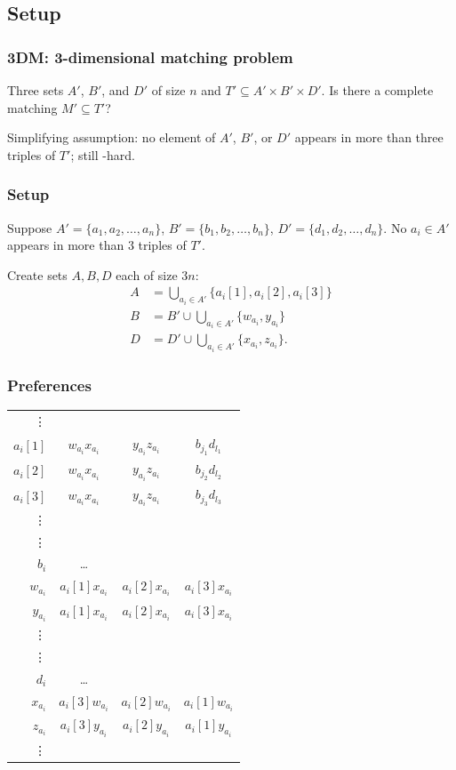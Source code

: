 \documentclass[mathserif,serif]{beamer}
\begin{document}
\subsection{Setup}

\begin{frame}
	\frametitle{3DM: 3-dimensional matching problem}

	Three sets $A'$, $B'$, and $D'$ of size $n$ and $T' \subseteq A' \times B' \times D'$.  Is there a complete
	matching $M' \subseteq T'$?

	Simplifying assumption: no element of $A'$, $B'$, or $D'$ appears in more than three triples of $T'$; still \NP-hard.
\end{frame}

\begin{frame}
	\frametitle{Setup}

	Suppose $A' = \{a_1, a_2, \dots, a_n\}$, $B' = \{b_1, b_2, \dots, b_n\}$, $D' = \{d_1, d_2, \dots, d_n\}$.  No
	$a_i \in A'$ appears in more than 3 triples of $T'$.

	Create sets $A, B, D$ each of size $3n$:
	\begin{align*}
	A &= \bigcup_{a_i \in A'} \{a_i[1], a_i[2], a_i[3]\} \\
	B &= B' \cup \bigcup_{a_i \in A'} \{w_{a_i}, y_{a_i}\} \\
	D &= D' \cup \bigcup_{a_i \in A'} \{x_{a_i}, z_{a_i}\}.
	\end{align*}
\end{frame}

\begin{frame}
	\frametitle{Preferences}

	\begin{tabular}{r | c c c}
		\vdots \\
		$a_i[1]$ &	$w_{a_i}x_{a_i}$ &	$y_{a_i}z_{a_i}$ &	$b_{j_1}d_{l_1}$ \\
		$a_i[2]$ &	$w_{a_i}x_{a_i}$ &	$y_{a_i}z_{a_i}$ &	$b_{j_2}d_{l_2}$ \\
		$a_i[3]$ &	$w_{a_i}x_{a_i}$ &	$y_{a_i}z_{a_i}$ &	$b_{j_3}d_{l_3}$ \\
		\vdots \\
		\hline
		\vdots \\
		$b_i$ &		\dots \\
		$w_{a_i}$ &	$a_i[1]x_{a_i}$ &	$a_i[2]x_{a_i}$ &	$a_i[3]x_{a_i}$ \\
		$y_{a_i}$ &	$a_i[1]x_{a_i}$ &	$a_i[2]x_{a_i}$ &	$a_i[3]x_{a_i}$ \\
		\vdots \\
		\hline
		\vdots \\
		$d_i$ &		\dots \\
		$x_{a_i}$ &	$a_i[3]w_{a_i}$ &	$a_i[2]w_{a_i}$ &	$a_i[1]w_{a_i}$ \\
		$z_{a_i}$ &	$a_i[3]y_{a_i}$ &	$a_i[2]y_{a_i}$ &	$a_i[1]y_{a_i}$ \\
		\vdots \\
	\end{tabular}
\end{frame}
\end{document}
